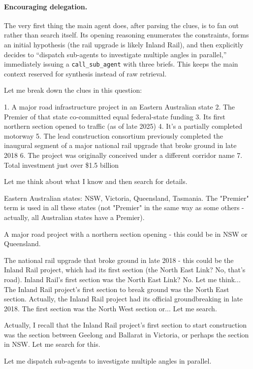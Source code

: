\documentclass{llmxive}
\begin{document}
\paragraph{Encouraging delegation.} The very first thing the main agent does, after parsing the clues, is to fan out rather than search itself. Its opening reasoning enumerates the constraints, forms an initial hypothesis (the rail upgrade is likely Inland Rail), and then explicitly decides to ``dispatch sub-agents to investigate multiple angles in parallel,'' immediately issuing a \texttt{call\_sub\_agent} with three briefs. This keeps the main context reserved for synthesis instead of raw retrieval.

\begin{tcolorbox}[breakable,enhanced jigsaw,colback=yellow!12,colframe=yellow!55,boxrule=0.4pt,left=5pt,right=5pt,top=3pt,bottom=3pt,fonttitle=\bfseries\sffamily\small,coltitle=black,fontupper=\small,title={Main-agent reasoning (first step)}]
Let me break down the clues in this question:

1. A major road infrastructure project in an Eastern Australian state
2. The Premier of that state co-committed equal federal-state funding
3. Its first northern section opened to traffic (as of late 2025)
4. It's a partially completed motorway
5. The lead construction consortium previously completed the inaugural segment of a major national rail upgrade that broke ground in late 2018
6. The project was originally conceived under a different corridor name
7. Total investment just over \$1.5 billion

Let me think about what I know and then search for details.

Eastern Australian states: NSW, Victoria, Queensland, Tasmania. The "Premier" term is used in all these states (not "Premier" in the same way as some others - actually, all Australian states have a Premier).

A major road project with a northern section opening - this could be in NSW or Queensland. 

The national rail upgrade that broke ground in late 2018 - this could be the Inland Rail project, which had its first section (the North East Link? No, that's road). Inland Rail's first section was the North East Link? No. Let me think... The Inland Rail project's first section to break ground was the North East section. Actually, the Inland Rail project had its official groundbreaking in late 2018. The first section was the North West section or... Let me search.

Actually, I recall that the Inland Rail project's first section to start construction was the section between Geelong and Ballarat in Victoria, or perhaps the section in NSW. Let me search for this.

Let me dispatch sub-agents to investigate multiple angles in parallel.
\end{tcolorbox}
\end{document}
